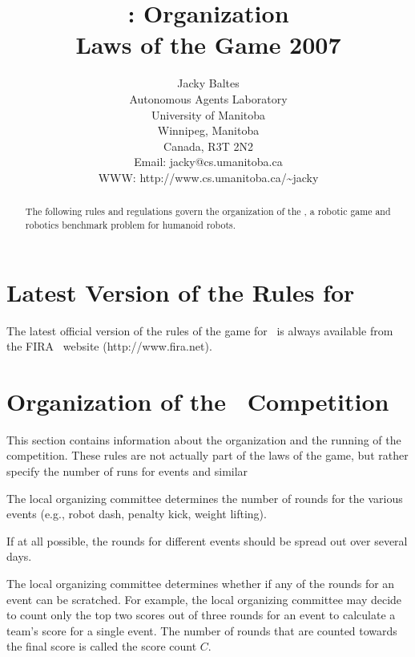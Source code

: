 \documentclass[12pt]{hurocup}
\begin{document}
\title{\HuroCup: Organization\\
  Laws of the Game 2007}

\author{Jacky Baltes\\
Autonomous Agents Laboratory\\
University of Manitoba\\
Winnipeg, Manitoba\\
Canada, R3T 2N2\\
Email: jacky@cs.umanitoba.ca\\
WWW: http://www.cs.umanitoba.ca/\~{ }jacky
}

\maketitle
\begin{abstract}
The following rules and regulations govern the organization of the
\HuroCup, a robotic game and robotics benchmark problem for humanoid
robots.
%
\end{abstract}

\section*{Latest Version of the Rules for \HuroCup}
\label{sec:updates}

The latest official version of the rules of the game for \HuroCup\ is
always available from the FIRA \HuroCup\ website (http://www.fira.net).

\newpage

\section{Organization of the \HuroCup\ Competition}
\label{sec:organization} 

This section contains information about the organization and the
running of the competition. These rules are not actually part of the
laws of the game, but rather specify the number of runs for events and
similar 

\label{law:number-of-events}

\begin{lawlist}[ORG]
  
\item The local organizing committee determines the number of rounds
 for the various events (e.g., robot dash, penalty kick, weight lifting).
  
\item If at all possible, the rounds for different events should be spread out  over several days.
 
\item The local organizing committee determines whether if any of the rounds 
 for an event can be scratched. For example, the local organizing
 committee may decide to count only the top two scores out of three
 rounds for an event to calculate a team's score for a single
 event. The number of rounds that are counted towards the final score
 is called the score count $C$.

\end{lawlist}
\end{document}
